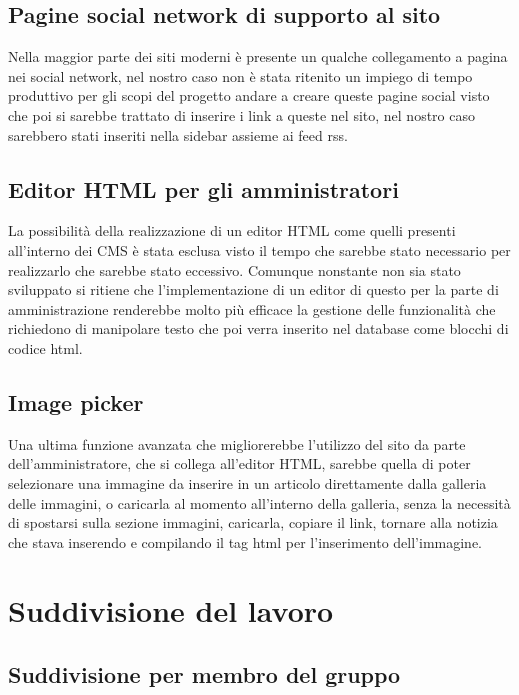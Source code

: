 \documentclass[openany, a4paper, 12pt]{report}
\begin{document}
		\section{Pagine social network di supporto al sito}
		Nella maggior parte dei siti moderni è presente un qualche collegamento a pagina nei social network, nel nostro caso non è stata ritenito un impiego di tempo produttivo per gli scopi del progetto andare a creare queste pagine social visto che poi si sarebbe trattato di inserire i link a queste nel sito, nel nostro caso sarebbero stati inseriti nella sidebar assieme ai feed rss.

		\section{Editor HTML per gli amministratori}
		La possibilità della realizzazione di un editor HTML come quelli presenti all'interno dei CMS è stata esclusa visto il tempo che sarebbe stato necessario per realizzarlo che sarebbe stato eccessivo. Comunque nonstante non sia stato sviluppato si ritiene che l'implementazione di un editor di questo per la parte di amministrazione renderebbe molto più efficace la gestione delle funzionalità che richiedono di manipolare testo che poi verra inserito nel database come blocchi di codice html.   
		
		\section{Image picker}
		Una ultima funzione avanzata che migliorerebbe l'utilizzo del sito da parte dell'amministratore, che si collega all'editor HTML, sarebbe quella di poter selezionare una immagine da inserire in un articolo direttamente dalla galleria delle immagini, o caricarla al momento all'interno della galleria, senza la necessità di spostarsi sulla sezione immagini, caricarla, copiare il link, tornare alla notizia che stava inserendo e compilando il tag html per l'inserimento dell'immagine.



	\chapter{Suddivisione del lavoro}
	\section{Suddivisione per membro del gruppo}
\end{document}
